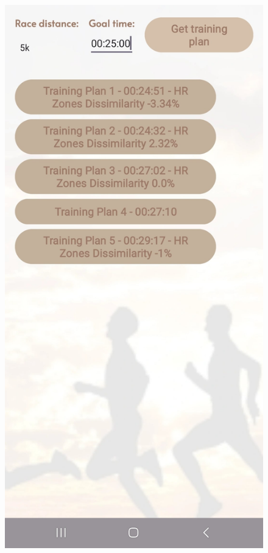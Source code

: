 \documentclass[12pt,oneside]{memoir}
\begin{document}
\begin{figure}[h]
  \centering
  \begin{minipage}{0.23\textwidth}
    \centering
    \includegraphics[width=\textwidth]{assets/pictures/app_screenshots/training_plan_0.jpg}

\end{minipage}
\end{figure}
\end{document}
